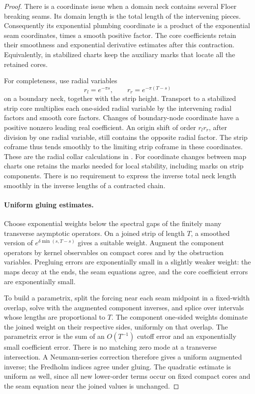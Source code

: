 \documentclass[11pt]{article}
\numberwithin{equation}{section}
\theoremstyle{definition}
\theoremstyle{remark}
\begin{document}
\begin{proof}
There is a coordinate issue when a domain neck contains several
Floer breaking seams.  Its domain length is the total length of the
intervening pieces.  Consequently its exponential plumbing
coordinate is a product of the exponential seam coordinates, times
a smooth positive factor.  The core coefficients retain their
smoothness and exponential derivative estimates after this
contraction.  Equivalently, in stabilized charts keep the auxiliary
marks that locate all the retained cores.

For completeness, use radial variables
\[
 r_l=e^{-\pi s},\qquad r_r=e^{-\pi(T-s)}
\]
on a boundary neck, together with the strip height.  Transport to a
stabilized strip core multiplies each one-sided radial variable by
the intervening radial factors and smooth core factors.  Changes of
boundary-node coordinate have a positive nonzero leading real
coefficient.  An origin shift of order $r_lr_r$, after division by
one radial variable, still contains the opposite radial factor.
The strip coframe thus tends smoothly to the limiting strip
coframe in these coordinates.  These are the radial collar
calculations in \cite[proof of Proposition~7.5]{A8}.
For coordinate changes between map charts one retains the marks
needed for local stability, including marks on strip components.
There is no requirement to express the inverse total neck length
smoothly in the inverse lengths of a contracted chain.

\paragraph{Uniform gluing estimates.}
Choose exponential weights below the spectral gaps of the finitely
many transverse asymptotic operators.  On a joined strip of length
$T$, a smoothed version of
$e^{\delta\min(s,T-s)}$ gives a suitable weight.  Augment the
component operators by kernel observables on compact cores and by
the obstruction variables.  Pregluing errors are exponentially
small in a slightly weaker weight: the maps decay at the ends, the
seam equations agree, and the core coefficient errors are
exponentially small.

To build a parametrix, split the forcing near each seam midpoint in
a fixed-width overlap, solve with the augmented component inverses,
and splice over intervals whose lengths are proportional to $T$.
The component one-sided weights dominate the joined weight on their
respective sides, uniformly on that overlap.  The parametrix error
is the sum of an $O(T^{-1})$ cutoff error and an exponentially small
coefficient error.  There is no matching zero mode at a transverse
intersection.  A Neumann-series correction therefore gives a
uniform augmented inverse; the Fredholm indices agree under
gluing.  The quadratic estimate is uniform as well, since all new
lower-order terms occur on fixed compact cores and the seam
equation near the joined values is unchanged.


\end{proof}
\end{document}
